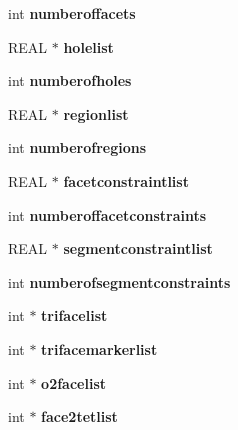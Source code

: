 \begin{DoxyCompactItemize}
int {\bfseries numberoffacets}
\item 
\mbox{\label{classtetgenio_a395bd7fc3f66dd013efd5176a0d54265}} 
R\+E\+AL $\ast$ {\bfseries holelist}
\item 
\mbox{\label{classtetgenio_ad12a46036cd44a7a646228d5471b51ac}} 
int {\bfseries numberofholes}
\item 
\mbox{\label{classtetgenio_a74b5593324c79ad60d9bb0951afb2b41}} 
R\+E\+AL $\ast$ {\bfseries regionlist}
\item 
\mbox{\label{classtetgenio_a0394c99b57c4412515183ada3c1d8951}} 
int {\bfseries numberofregions}
\item 
\mbox{\label{classtetgenio_aabfef9df7956218bcb98ee39f1a9814b}} 
R\+E\+AL $\ast$ {\bfseries facetconstraintlist}
\item 
\mbox{\label{classtetgenio_acd7176cc55338187a391016acfb53913}} 
int {\bfseries numberoffacetconstraints}
\item 
\mbox{\label{classtetgenio_ab63298ebb6904d1dfa8ddebb13440ef7}} 
R\+E\+AL $\ast$ {\bfseries segmentconstraintlist}
\item 
\mbox{\label{classtetgenio_a56142dec4914ffaaf5093c4aaa23b7d4}} 
int {\bfseries numberofsegmentconstraints}
\item 
\mbox{\label{classtetgenio_a25e290684bfb26d4d9b5e67059c572e2}} 
int $\ast$ {\bfseries trifacelist}
\item 
\mbox{\label{classtetgenio_a22a2e0937d0da63a2fda26fc1671b32f}} 
int $\ast$ {\bfseries trifacemarkerlist}
\item 
\mbox{\label{classtetgenio_aad1e2f66ad5c438fb2bee5d510fdca19}} 
int $\ast$ {\bfseries o2facelist}
\item 
\mbox{\label{classtetgenio_a0cfb083e23533114e4d616810b082e66}} 
int $\ast$ {\bfseries face2tetlist}
\item 

\end{DoxyCompactItemize}
